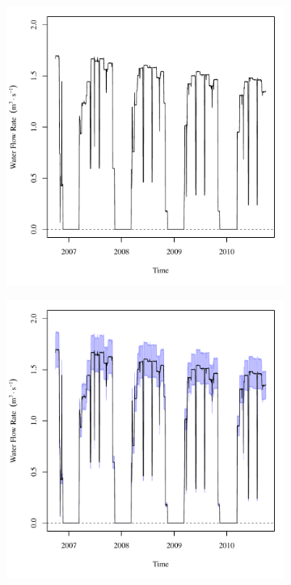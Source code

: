\begin{linenumbers}
\begin{landscape}
\begin{figure}
\begin{subfigure}{0.7\textwidth}
			\includegraphics[width=\tableCustomSize]{"Figures/Results_USR/Deterministic/Q RFD"}
		\end{subfigure}%
		\begin{subfigure}{0.7\textwidth}
			\centering
			\includegraphics[width=\tableCustomSize]{"Figures/Results_USR/Stochastic/Q RFD"}

\end{subfigure}
\end{figure}
\end{landscape}
\end{linenumbers}
